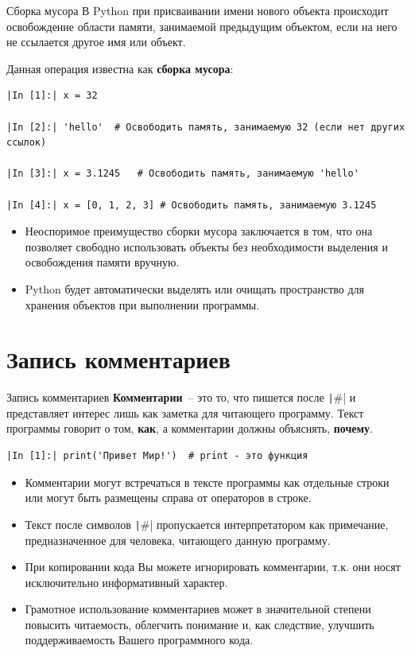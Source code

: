 \documentclass[aspectratio=169, mathserif]{beamer}	%
\begin{document}
\begin{frame}[fragile]{Сборка мусора}
\scriptsize
В Python при присваивании имени нового объекта происходит освобождение области памяти, занимаемой предыдущим объектом, если на него не ссылается другое имя или объект. 

Данная операция известна как \alert{\textbf{сборка мусора}}:
\begin{verbatim}
|In [1]:| x = 32 

|In [2]:| 'hello'  # Освободить память, занимаемую 32 (если нет других ссылок)

|In [3]:| x = 3.1245   # Освободить память, занимаемую 'hello'

|In [4]:| x = [0, 1, 2, 3] # Освободить память, занимаемую 3.1245
\end{verbatim}
\begin{itemize}
	\item Неоспоримое преимущество сборки мусора заключается в том, что она позволяет свободно использовать объекты без необходимости выделения и освобождения памяти вручную. 
	\item Python  будет автоматически выделять или очищать пространство для хранения объектов при выполнении программы.
\end{itemize}
\vfill	
\end{frame}

\section{Запись комментариев}
\sectionframe

\begin{frame}[fragile]{Запись комментариев}
\scriptsize
\textcolor{extraorange}{\textbf{Комментарии}}~-- это то, что пишется после \texttt|#| и представляет интерес лишь как заметка для читающего программу. Текст программы говорит о том, \textbf{как}, а комментарии должны объяснять, \textbf{почему}.
\begin{verbatim}
|In [1]:| print('Привет Мир!')  # print - это функция 
\end{verbatim}
\begin{itemize}
	\item Комментарии могут встречаться в тексте программы как отдельные строки или могут быть размещены справа от операторов в строке.
	\item Текст после символов \texttt|#| пропускается интерпретатором как примечание, предназначенное для человека, читающего данную программу.
	\item При копировании кода Вы можете игнорировать комментарии, т.к. они носят   исключительно информативный характер.
	\item Грамотное использование комментариев может в значительной степени повысить читаемость, облегчить понимание и, как следствие, улучшить поддерживаемость Вашего программного кода.
\end{itemize}
\vfill
\end{frame}
\end{document}
